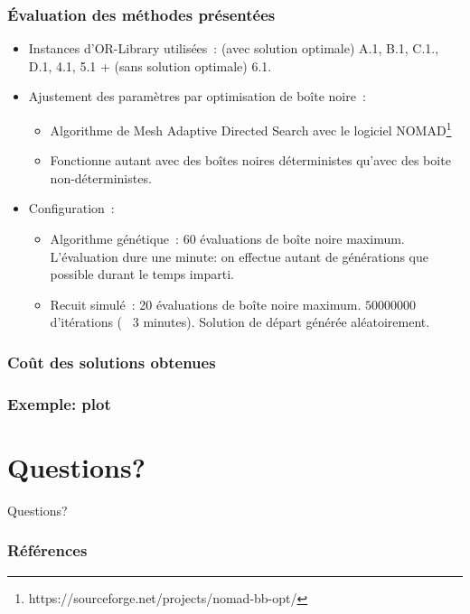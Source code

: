 \documentclass[aspectratio=169,11pt]{beamer}
\begin{document}
	\begin{frame}
		\frametitle{Évaluation des méthodes présentées}
		\begin{itemize}
			\item Instances d'OR-Library utilisées~:
				(avec solution optimale) A.1, B.1, C.1., D.1, 4.1, 5.1
				+ (sans solution optimale) 6.1.
			\vfill
			\item<2-> Ajustement des paramètres par optimisation de boîte noire~:
				\begin{itemize}
					\item Algorithme de Mesh Adaptive Directed Search avec le logiciel NOMAD\footnote{{https://sourceforge.net/projects/nomad-bb-opt/}}
					\item Fonctionne autant avec des boîtes noires déterministes qu'avec des boite non-déterministes.
				\end{itemize}
			\vfill
			\item<3-> Configuration~:
				\begin{itemize}
					\item Algorithme génétique~: 60 évaluations de boîte noire maximum. L'évaluation dure une minute: on effectue autant de générations que possible durant le temps imparti.
					\item Recuit simulé~: 20 évaluations de boîte noire maximum. \(50 000 000\) d'itérations (~ 3 minutes). Solution de départ générée aléatoirement.
				\end{itemize}
		\end{itemize}
	\end{frame}

	\begin{frame}
		\frametitle{Coût des solutions obtenues}
		\centering
		
	\end{frame}


	\begin{frame}
		\frametitle{Exemple: plot}
		\centering
	\end{frame}
	\section*{Questions?}
		\begin{frame}[focus]
			Questions?
		\end{frame}
	\appendix
		\begin{frame}[t,allowframebreaks]
			\frametitle{Références}
			\printbibliography[heading=bibintoc]{}
		\end{frame}
\end{document}
